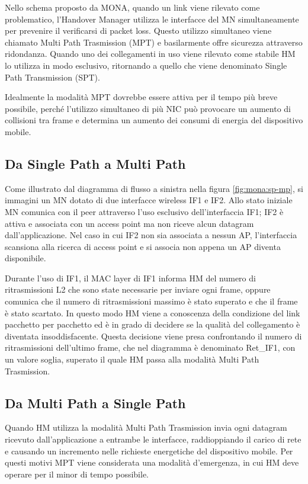 \documentclass[12pt,a4paper,openright,twoside]{book}
\begin{document}
Nello schema proposto da MONA, quando un link viene rilevato come
problematico, l'Handover Manager utilizza le interfacce del MN
simultaneamente per prevenire il verificarsi di packet loss. Questo
utilizzo simultaneo viene chiamato Multi Path Trasmission (MPT) e
basilarmente offre sicurezza attraverso ridondanza. Quando uno dei
collegamenti in uso viene rilevato come stabile HM lo utilizza in modo
esclusivo, ritornando a quello che viene denominato Single Path
Transmission (SPT).

Idealmente la modalità MPT dovrebbe essere attiva
per il tempo più breve possibile, perché l'utilizzo simultaneo di più
NIC può provocare un aumento di collisioni tra frame e determina un
aumento dei consumi di energia del dispositivo mobile.

\subsection{Da Single Path a Multi Path}

Come illustrato dal diagramma di flusso a sinistra nella figura
\ref{fig:mona:sp-mp}, si immagini un MN dotato di due interfacce
wireless IF1 e IF2. Allo stato iniziale MN comunica con il peer
attraverso l'uso esclusivo dell'interfaccia IF1; IF2 è attiva e
associata con un access point ma non riceve alcun datagram
dall'applicazione. Nel caso in cui IF2 non sia associata a nessun AP,
l'interfaccia scansiona alla ricerca di access point e si associa non
appena un AP diventa disponibile.

Durante l'uso di IF1, il MAC layer di IF1 informa HM del numero di
ritrasmissioni L2 che sono state necessarie per inviare ogni frame,
oppure comunica che il numero di ritrasmissioni massimo è stato
superato e che il frame è stato scartato. In questo modo HM viene a
conoscenza della condizione del link pacchetto per pacchetto ed è in
grado di decidere se la qualità del collegamento è diventata
insoddisfacente. Questa decisione viene presa confrontando il numero
di ritrasmissioni dell'ultimo frame, che nel diagramma è denominato
Ret\_IF1, con un valore soglia, superato il quale HM passa alla
modalità Multi Path Trasmission.

\subsection{Da Multi Path a Single Path}

Quando HM utilizza la modalità Multi Path Trasmission invia ogni
datagram ricevuto dall'applicazione a entrambe le interfacce,
raddioppiando il carico di rete e causando un incremento nelle
richieste energetiche del dispositivo mobile. Per questi motivi MPT
viene considerata una modalità d'emergenza, in cui HM deve operare per
il minor di tempo possibile.
\end{document}

